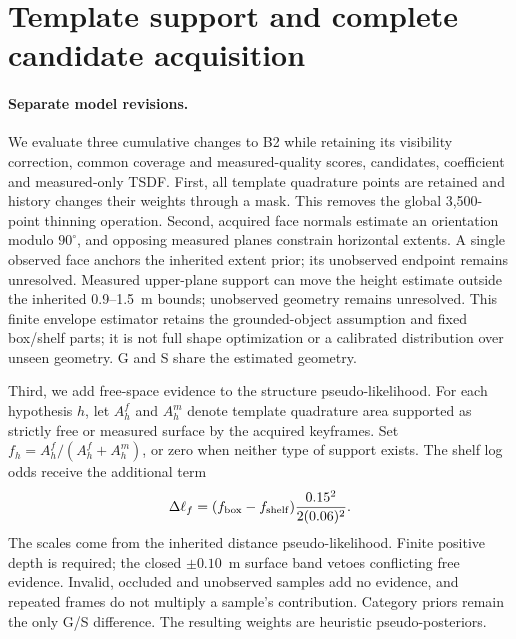 \clearpage
\section{Template support and complete candidate acquisition}
\label{sec:staged-template-geometry}

\paragraph{Separate model revisions.}
We evaluate three cumulative changes to B2 while retaining its visibility correction, common coverage and measured-quality scores, candidates, coefficient and measured-only TSDF. First, all template quadrature points are retained and history changes their weights through a mask. This removes the global 3,500-point thinning operation. Second, acquired face normals estimate an orientation modulo $90^\circ$, and opposing measured planes constrain horizontal extents. A single observed face anchors the inherited extent prior; its unobserved endpoint remains unresolved. Measured upper-plane support can move the height estimate outside the inherited 0.9--1.5~m bounds; unobserved geometry remains unresolved. This finite envelope estimator retains the grounded-object assumption and fixed box/shelf parts; it is not full shape optimization or a calibrated distribution over unseen geometry. G and S share the estimated geometry.

Third, we add free-space evidence to the structure pseudo-likelihood. For each hypothesis $h$, let $A_h^f$ and $A_h^m$ denote template quadrature area supported as strictly free or measured surface by the acquired keyframes. Set $f_h=A_h^f/(A_h^f+A_h^m)$, or zero when neither type of support exists. The shelf log odds receive the additional term
\[
\Delta\ell_f=(f_{\rm box}-f_{\rm shelf})\frac{0.15^2}{2(0.06)^2}.
\]
The scales come from the inherited distance pseudo-likelihood. Finite positive depth is required; the closed $\pm0.10$~m surface band vetoes conflicting free evidence. Invalid, occluded and unobserved samples add no evidence, and repeated frames do not multiply a sample's contribution. Category priors remain the only G/S difference. The resulting weights are heuristic pseudo-posteriors.

